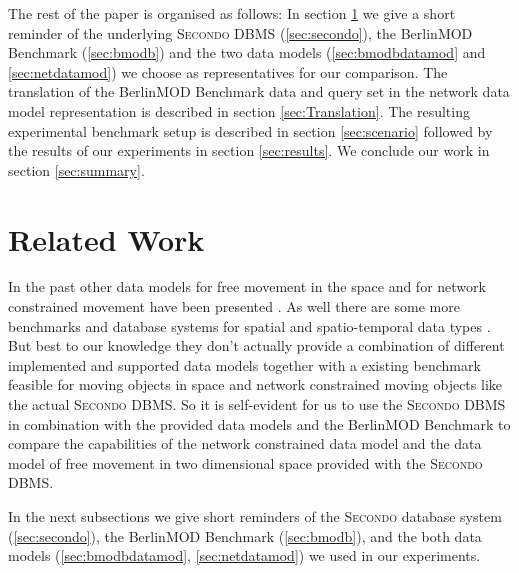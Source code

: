 \documentclass[a4paper]{article}
\newcommand{\secondo}{\textsc{Secondo}}
\newcommand{\bmodb} {BerlinMOD Benchmark}
\begin{document}

The rest of the paper is organised as follows: In section \ref{sec:relWork} we give a
short reminder of the underlying \secondo{} DBMS (\ref{sec:secondo}), the \bmodb{}
(\ref{sec:bmodb}) and the two data models (\ref{sec:bmodbdatamod}
and \ref{sec:netdatamod}) we choose as representatives for our comparison.
The translation of the \bmodb{} data and query set in the network data model
representation is described in section \ref{sec:Translation}. The resulting
experimental benchmark setup is described in section \ref{sec:scenario} followed
by the results of our experiments in section \ref{sec:results}.
We conclude our work in section \ref{sec:summary}.
\section{Related Work}
\label{sec:relWork}
In the past other data models for free movement in the space
\cite{chenzaniolosqlst,335426} and for network constrained movement have been
presented \cite{1146465,956692,VazWolfNetMod}. As well there are some more
benchmarks \cite{COSTBenchmark, QueriesTheodoridis} and database systems for
spatial and spatio-temporal data types \cite{1054151,HERMES}. But best to our
knowledge they don't actually provide a combination of different implemented
and supported data models together with a existing benchmark feasible for moving
objects in space and network constrained moving objects like the actual
\secondo{} DBMS. So it is self-evident for us to use the \secondo{} DBMS in
combination with the provided data models and the \bmodb{} to compare the
capabilities of the network constrained data model and the data model of free
movement in two dimensional space provided with the \secondo{} DBMS.

In the next subsections we give short reminders of the \secondo{} database system
(\ref{sec:secondo}), the \bmodb{} (\ref{sec:bmodb}), and the both data models
(\ref{sec:bmodbdatamod}, \ref{sec:netdatamod}) we used in our experiments.
\end{document}
